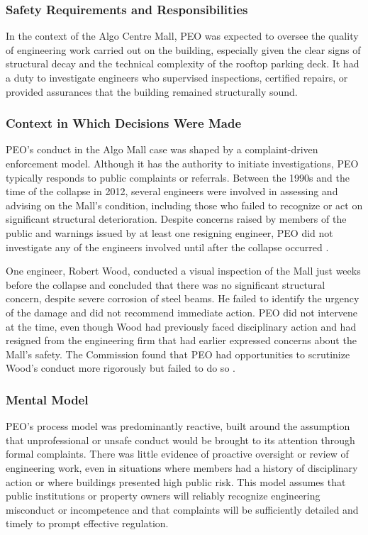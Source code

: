 \documentclass[12pt]{article}
\begin{document}
\subsubsection*{Safety Requirements and Responsibilities}

In the context of the Algo Centre Mall, PEO was expected to oversee the quality of engineering work carried out on the building, especially given the clear signs of structural decay and the technical complexity of the rooftop parking deck. It had a duty to investigate engineers who supervised inspections, certified repairs, or provided assurances that the building remained structurally sound.

\subsubsection*{Context in Which Decisions Were Made}

PEO's conduct in the Algo Mall case was shaped by a complaint-driven enforcement model. Although it has the authority to initiate investigations, PEO typically responds to public complaints or referrals. Between the 1990s and the time of the collapse in 2012, several engineers were involved in assessing and advising on the Mall's condition, including those who failed to recognize or act on significant structural deterioration. Despite concerns raised by members of the public and warnings issued by at least one resigning engineer, PEO did not investigate any of the engineers involved until after the collapse occurred \cite[p393-395]{AlgoLakeReport1}.

One engineer, Robert Wood, conducted a visual inspection of the Mall just weeks before the collapse and concluded that there was no significant structural concern, despite severe corrosion of steel beams. He failed to identify the urgency of the damage and did not recommend immediate action. PEO did not intervene at the time, even though Wood had previously faced disciplinary action and had resigned from the engineering firm that had earlier expressed concerns about the Mall's safety. The Commission found that PEO had opportunities to scrutinize Wood's conduct more rigorously but failed to do so \cite[p393-396]{AlgoLakeReport1}.

\subsubsection*{Mental Model}

PEO's process model was predominantly reactive, built around the assumption that unprofessional or unsafe conduct would be brought to its attention through formal complaints. There was little evidence of proactive oversight or review of engineering work, even in situations where members had a history of disciplinary action or where buildings presented high public risk. This model assumes that public institutions or property owners will reliably recognize engineering misconduct or incompetence and that complaints will be sufficiently detailed and timely to prompt effective regulation.
\end{document}
